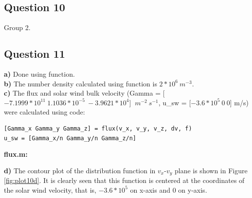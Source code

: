 \documentclass{article}
\begin{document}
\subsection{Question 10}
Group 2.

\subsection{Question 11}
\textbf{a)} Done using  function.\\
\textbf{b)} The number density calculated using function  is $2*10^6\:m^{-3}$.\\
\textbf{c)} The flux and solar wind bulk velocity (Gamma = [$-7.1999*10^{11}\:1.1036*10^{-5}\:-3.9621*10^4]$ $\:m^{-2}\:s^{-1}$, u\_sw = [$-3.6*10^5\:0\:0$] m/s) were calculated using code:
\begin{lstlisting}
[Gamma_x Gamma_y Gamma_z] = flux(v_x, v_y, v_z, dv, f)
u_sw = [Gamma_x/n Gamma_y/n Gamma_z/n]
\end{lstlisting}
\textbf{flux.m:}

\textbf{d)} The contour plot of the distribution function in $v_x$-$v_y$ plane is shown in Figure \ref{fig:plot10d}. It is clearly seen that this function is centered at the coordinates of the solar wind velocity, that is, $-3.6*10^5$ on x-axis and 0 on y-axis.
\end{document}
